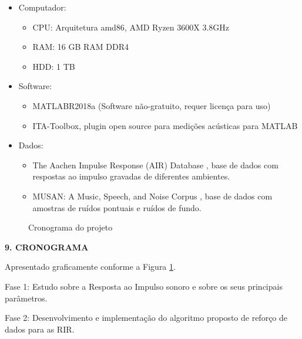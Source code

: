 \documentclass[a4paper,12pt,oneside,openany]{report}
\begin{document}
\begin{itemize}
      \item Computador:
      \begin{itemize}
            \item CPU: Arquitetura amd86, AMD Ryzen 3600X 3.8GHz
            \item RAM: 16 GB RAM DDR4
            \item HDD: 1 TB
      \end{itemize}

      \item Software:
      \begin{itemize}
            \item MATLAB\textregistered \space R2018a (Software não-gratuito, requer licença para uso)
            \item ITA-Toolbox, plugin open source para medições acústicas para MATLAB\textregistered
      \end{itemize}

      \item Dados:
      \begin{itemize}
            \item The Aachen Impulse Response (AIR) Database \cite{AIR_Database}, base de dados com respostas ao impulso
            gravadas de diferentes ambientes.
            \item MUSAN: A Music, Speech, and Noise Corpus \cite{noiseLib}, base de dados com amostras de ruídos pontuais
            e ruídos de fundo.
      \end{itemize}
\end{itemize}

\pagebreak

\begin{figure}[htp]      
      \begin{center}
      \caption{\footnotesize{Cronograma do projeto}}
      \label{Fig:Cronograma}
      \end{center}
\end{figure} 

\vspace{0.4cm}
\textbf{9. CRONOGRAMA}

Apresentado graficamente conforme a Figura \ref{Fig:Cronograma}.

Fase 1: Estudo sobre a Resposta ao Impulso sonoro e sobre os seus principais parâmetros.

Fase 2: Desenvolvimento e implementação do algoritmo proposto \cite{RIR_Data_Aug} de reforço de dados para as RIR.
\end{document}
